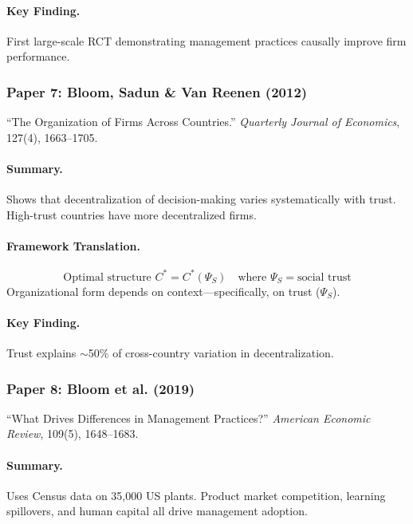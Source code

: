 \documentclass[12pt,a4paper]{article}
\begin{document}
\paragraph{Key Finding.}
First large-scale RCT demonstrating management practices causally improve firm performance.

\subsubsection{Paper 7: Bloom, Sadun \& Van Reenen (2012)}

``The Organization of Firms Across Countries.''
\textit{Quarterly Journal of Economics}, 127(4), 1663--1705.

\paragraph{Summary.}
Shows that decentralization of decision-making varies systematically with trust.
High-trust countries have more decentralized firms.

\paragraph{Framework Translation.}
\begin{equation}
  \text{Optimal structure } C^* = C^*(\Psi_S) \quad \text{where } \Psi_S = \text{social trust}
\end{equation}
Organizational form depends on context---specifically, on trust ($\Psi_S$).

\paragraph{Key Finding.}
Trust explains $\sim$50\% of cross-country variation in decentralization.

\subsubsection{Paper 8: Bloom et al. (2019)}

``What Drives Differences in Management Practices?''
\textit{American Economic Review}, 109(5), 1648--1683.

\paragraph{Summary.}
Uses Census data on 35,000 US plants. Product market competition, learning spillovers,
and human capital all drive management adoption.
\end{document}
